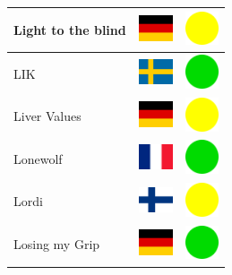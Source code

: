 \documentclass[12pt, a4paper, twoside]{report}
\begin{document}
\begin{center}
\begin{longtable}{|p{5cm}|p{2cm}|p{2cm}|}
 Light to the blind                                         & \includegraphics[width=1cm]{4x3/de} &   \includegraphics[width=1cm]{likes/m} \\ \hline
 LIK                                                        & \includegraphics[width=1cm]{4x3/se} &   \includegraphics[width=1cm]{likes/y} \\ \hline
 Liver Values                                               & \includegraphics[width=1cm]{4x3/de} &   \includegraphics[width=1cm]{likes/m} \\ \hline
 Lonewolf                                                   & \includegraphics[width=1cm]{4x3/fr} &   \includegraphics[width=1cm]{likes/y} \\ \hline
 Lordi                                                      & \includegraphics[width=1cm]{4x3/fi} &   \includegraphics[width=1cm]{likes/m} \\ \hline
 Losing my Grip                                             & \includegraphics[width=1cm]{4x3/de} &   \includegraphics[width=1cm]{likes/y} \\ \hline

\end{longtable}
\end{center}
\end{document}
